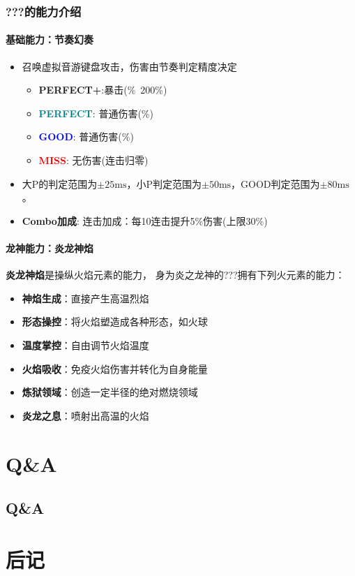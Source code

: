 \documentclass[lang=cn,newtx,10pt,scheme=chinese]{elegantbook}
\newcommand{\dr}{???}
\begin{document}
\newpage

\subsection{\dr{}的能力介绍}
\subsubsection{基础能力：节奏幻奏}
\begin{itemize}
    \item 召唤虚拟音游键盘攻击，伤害由节奏判定精度决定
          \begin{itemize}
              \item \textcolor{yellow!75!black}{\textbf{PERFECT+}}:暴击(\%~200\%)
              \item \textcolor{teal}{\textbf{PERFECT}}: 普通伤害(\%)
              \item \textcolor{blue}{\textbf{GOOD}}: 普通伤害(\%)
              \item \textcolor{red}{\textbf{MISS}}: 无伤害(连击归零)
          \end{itemize}
    \item 大P的判定范围为\(\pm 25 \text{ms}\)，小P判定范围为\(\pm 50 \text{ms}\)，GOOD判定范围为\(\pm 80 \text{ms}\)。
    \item \textbf{Combo加成}: 连击加成：每10连击提升5\%伤害(上限30\%)
\end{itemize}

\subsubsection{龙神能力：炎龙神焰}

\textbf{炎龙神焰}是操纵火焰元素的能力，
身为炎之龙神的\dr{}拥有下列火元素的能力：

\begin{itemize}
    \setlength\itemsep{0em}
    \item \textbf{神焰生成}：直接产生高温烈焰
    \item \textbf{形态操控}：将火焰塑造成各种形态，如火球
    \item \textbf{温度掌控}：自由调节火焰温度
    \item \textbf{火焰吸收}：免疫火焰伤害并转化为自身能量
    \item \textbf{炼狱领域}：创造一定半径的绝对燃烧领域
    \item \textbf{炎龙之息}：喷射出高温的火焰
\end{itemize}

\chapter{Q\&A}
\section{Q\&A}


\chapter*{后记}
\end{document}
